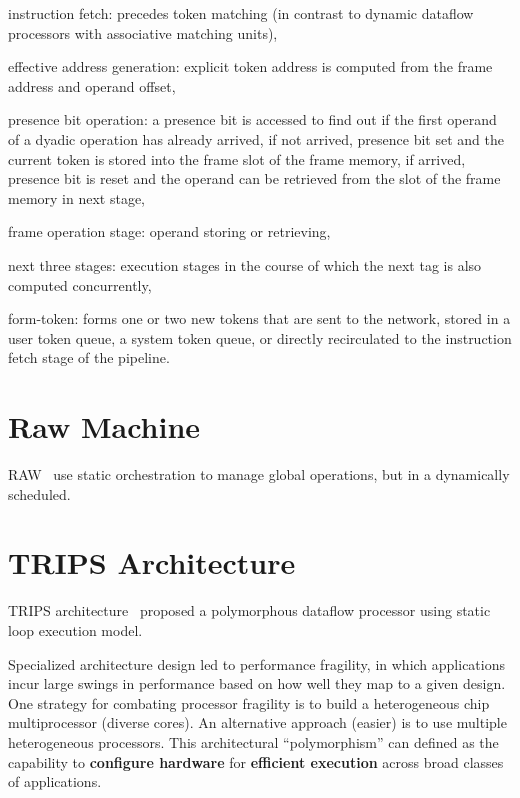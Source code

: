 \documentclass[UTF8,12pt,a4paper]{article}
\begin{document}
\begin{compactitem}
  \item instruction fetch: precedes token matching (in contrast to dynamic dataflow processors with associative matching units),
  \item effective address generation: explicit token address is computed from the frame address and operand offset,
  \item presence bit operation: a presence bit is accessed to find out if the first operand of a dyadic operation has already arrived,
        if not arrived, presence bit set and the current token is stored into the frame slot of the frame memory,
        if arrived, presence bit is reset and the operand can be retrieved from the slot of the frame memory in next stage,
  \item frame operation stage: operand storing or retrieving,
  \item next three stages: execution stages in the course of which the next tag is also computed concurrently,
  \item form-token: forms one or two new tokens that are sent to the network, stored in a user token queue,
        a system token queue, or directly recirculated to the instruction fetch stage of the pipeline.
\end{compactitem}

\clearpage

\section{Raw Machine}

RAW~\cite{DBLP:conf/asplos/LeeBFSBSA98} use static orchestration to manage global operations,
but in a dynamically scheduled.

\clearpage

\section{TRIPS Architecture}

TRIPS architecture~\cite{DBLP:conf/isca/SankaralingamNLKHBKM03} proposed 
a polymorphous dataflow processor using static loop execution model.

Specialized architecture design led to performance fragility,
in which applications incur large swings in performance
based on how well they map to a given design.
One strategy for combating processor fragility is to build a heterogeneous chip multiprocessor (diverse cores).
An alternative approach (easier) is to use multiple heterogeneous processors.
This architectural ``polymorphism'' can defined as the capability to \textbf{configure hardware}
for \textbf{efficient execution} across broad classes of applications.
\end{document}
